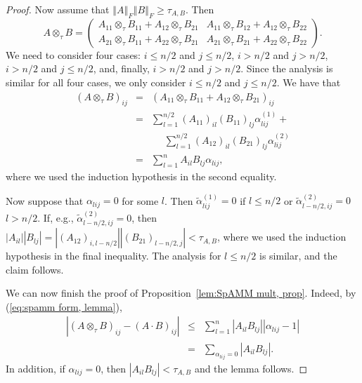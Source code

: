 \documentclass[letterpaper,twocolumn,amsmath,amsfont,amssymb,english,aps,jcp,preprintnumbers,groupaddress,nofootinbib,tightenlines,floatfix]{revtex4}
\theoremstyle{plain}
\theoremstyle{remark}
\theoremstyle{plain}
\begin{document}
\begin{proof}
Now assume that $\left\Vert A\right\Vert _{F}\left\Vert B\right\Vert _{F}\geq\tau_{A,B}$.
Then
\[
A\otimes_{\tau}B=\left(\begin{array}{cc}
A_{11}\otimes_{\tau}B_{11}+A_{12}\otimes_{\tau}B_{21} & A_{11}\otimes_{\tau}B_{12}+A_{12}\otimes_{\tau}B_{22}\\
A_{21}\otimes_{\tau}B_{11}+A_{22}\otimes_{\tau}B_{21} & A_{21}\otimes_{\tau}B_{21}+A_{22}\otimes_{\tau}B_{22}
\end{array}\right).
\]
We need to consider four cases: $i\leq n/2$ and $j\leq n/2$, $i>n/2$
and $j>n/2$, $i>n/2$ and $j\leq n/2$, and, finally, $i>n/2$ and
$j>n/2$. Since the analysis is similar for all four cases, we only
consider $i\leq n/2$ and $j\leq n/2$. We have that 
\begin{eqnarray*}
\left(A\otimes_{\tau}B\right)_{ij} & = & \left(A_{11}\otimes_{\tau}B_{11}+A_{12}\otimes_{\tau}B_{21}\right)_{ij}\\
 & = & \sum_{l=1}^{n/2}\left(A_{11}\right)_{il}\left(B_{11}\right)_{lj}\alpha_{lij}^{(1)} + \\
 & & \,\,\,\,\,\,\,\, \sum_{l=1}^{n/2}\left(A_{12}\right)_{il}\left(B_{21}\right)_{lj}\alpha_{lij}^{(2)}\\
 & = & \sum_{l=1}^{n}A_{il}B_{lj}\alpha_{lij},
\end{eqnarray*}
where we used the induction hypothesis in the second equality.

Now suppose that $\alpha_{lij}=0$ for some $l$. Then $\tilde{\alpha}_{lij}^{(1)}=0$
if $l\leq n/2$ or $\tilde{\alpha}_{l-n/2,ij}^{(2)}=0$ $l>n/2$.
If, e.g., $\tilde{\alpha}_{l-n/2,ij}^{(2)}=0$, then $\left|A_{il}\right|\left|B_{lj}\right|=\left|\left(A_{12}\right)_{i,l-n/2}\right|\left|\left(B_{21}\right)_{l-n/2,j}\right|<\tau_{A,B}$,
where we used the induction hypothesis in the final inequality. The
analysis for $l\leq n/2$ is similar, and the claim
follows.

We can now finish the proof of Proposition~\ref{lem:SpAMM mult, prop}. Indeed, by (\ref{eq:spamm form, lemma}),
\begin{eqnarray*}
\left|\left(A\otimes_{\tau}B\right)_{ij}-\left(A\cdot B\right)_{ij}\right| & \leq & \sum_{l=1}^{n}\left|A_{il}B_{lj}\right|\left|\alpha_{lij}-1\right|\\
 & = & \sum_{\alpha_{lij}=0}\left|A_{il}B_{lj}\right|.
\end{eqnarray*}
In addition, if $\alpha_{lij}=0$, then $\left|A_{il}B_{lj}\right|<\tau_{A,B}$
and the lemma follows.

\end{proof}
\end{document}
